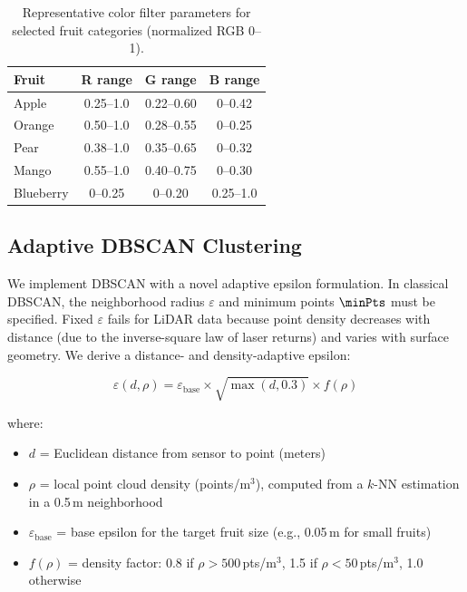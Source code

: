 \documentclass[12pt,a4paper]{article}
\begin{document}
\begin{table}[htbp]
\centering
\caption{Representative color filter parameters for selected fruit categories (normalized RGB 0--1).}
\label{tab:color}
\begin{tabular}{lccc}
\toprule
Fruit & R range & G range & B range \\
\midrule
Apple    & 0.25--1.0 & 0.22--0.60 & 0--0.42 \\
Orange   & 0.50--1.0 & 0.28--0.55 & 0--0.25 \\
Pear     & 0.38--1.0 & 0.35--0.65 & 0--0.32 \\
Mango    & 0.55--1.0 & 0.40--0.75 & 0--0.30 \\
Blueberry& 0--0.25   & 0--0.20    & 0.25--1.0 \\
\bottomrule
\end{tabular}
\end{table}

\subsection{Adaptive DBSCAN Clustering}

We implement DBSCAN with a novel adaptive epsilon formulation. In classical DBSCAN, the neighborhood radius $\varepsilon$ and minimum points $\minPts$ must be specified. Fixed $\varepsilon$ fails for LiDAR data because point density decreases with distance (due to the inverse-square law of laser returns) and varies with surface geometry. We derive a distance- and density-adaptive epsilon:

\begin{equation}
\varepsilon(d, \rho) = \varepsilon_{\mathrm{base}} \times \sqrt{\max(d, 0.3)} \times f(\rho)
\label{eq:adaptive-eps}
\end{equation}

where:
\begin{itemize}
  \item $d$ = Euclidean distance from sensor to point (meters)
  \item $\rho$ = local point cloud density (points/m$^3$), computed from a $k$-NN estimation in a 0.5\,m neighborhood
  \item $\varepsilon_{\mathrm{base}}$ = base epsilon for the target fruit size (e.g., 0.05\,m for small fruits)
  \item $f(\rho)$ = density factor: 0.8 if $\rho > 500$\,pts/m$^3$, 1.5 if $\rho < 50$\,pts/m$^3$, 1.0 otherwise
\end{itemize}
\end{document}
